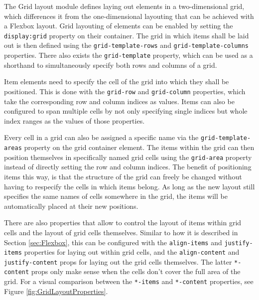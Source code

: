 The Grid layout module defines laying out elements in a two-dimensional grid, which differences it from the one-dimensional layouting that can be achieved with a Flexbox layout. Grid layouting of elements can be enabled by setting the \lstinline{display:grid} property on their container. The grid in which items shall be laid out is then defined using the \lstinline{grid-template-rows} and \lstinline{grid-template-columns} properties. There also exists the \lstinline{grid-template} property, which can be used as a shorthand to simultaneously specify both rows and columns of a grid.

Item elements need to specify the cell of the grid into which they shall be positioned. This is done with the \lstinline{grid-row} and \lstinline{grid-column} properties, which take the corresponding row and column indices as values. Items can also be configured to span multiple cells by not only specifying single indices but whole index ranges as the values of those properties.

Every cell in a grid can also be assigned a specific name via the \lstinline{grid-template-areas} property on the grid container element. The items within the grid can then position themselves in specifically named grid cells using the \lstinline{grid-area} property instead of directly setting the row and column indices. The benefit of positioning items this way, is that the structure of the grid can freely be changed without having to respecify the cells in which items belong. As long as the new layout still specifies the same names of cells somewhere in the grid, the items will be automatically placed at their new positions.

There are also properties that allow to control the layout of items within grid cells and the layout of grid cells themselves. Similar to how it is described in Section \ref{sec:Flexbox}, this can be configured with the \lstinline{align-items} and \lstinline{justify-items} properties for laying out within grid cells, and the \lstinline{align-content} and \lstinline{justify-content} props for laying out the grid cells themselves. The latter \lstinline{*-content} props only make sense when the cells don't cover the full area of the grid. For a visual comparison between the \lstinline{*-items} and \lstinline{*-content} properties, see Figure \ref{fig:GridLayoutProperties}.

